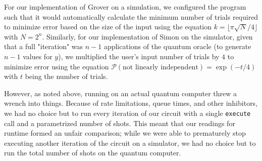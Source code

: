 \documentclass[12pt]{article}
\begin{document}
For our implementation of Grover on a simulation, we configured the program such that it would automatically calculate the minimum number of trials required to minimize error based on the size of the input using the equation $k = \lfloor\pi\sqrt{N}/4\rfloor$ with $N = 2^n$.
Similarly, for our implementation of Simon on the simulator, given that a full "iteration" was $n-1$ applications of the quantum oracle (to generate $n-1$ values for $y$), we multiplied the user's input number of trials by $4$ to minimize error using the equation $\mathcal{P}(\text{not linearly independent}) = \exp(-t/4)$ with $t$ being the number of trials.

However, as noted above, running on an actual quantum computer threw a wrench into things.
Because of rate limitations, queue times, and other inhibitors, we had no choice but to run every iteration of our circuit with a single \texttt{execute} call and a parametrized number of shots.
This meant that our readings for runtime formed an unfair comparison; while we were able to prematurely stop executing another iteration of the circuit on a simulator, we had no choice but to run the total number of shots on the quantum computer.

\nocite{pyquil}
\nocite{Qiskit}
\end{document}
